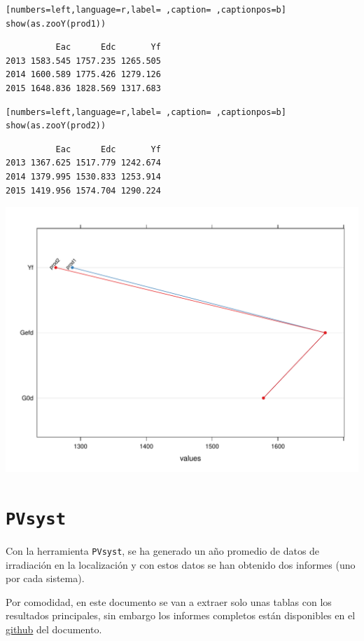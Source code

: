 \begin{lstlisting}[numbers=left,language=r,label= ,caption= ,captionpos=b]
show(as.zooY(prod1))
\end{lstlisting}

\begin{verbatim}
          Eac      Edc       Yf
2013 1583.545 1757.235 1265.505
2014 1600.589 1775.426 1279.126
2015 1648.836 1828.569 1317.683
\end{verbatim}


\begin{lstlisting}[numbers=left,language=r,label= ,caption= ,captionpos=b]
show(as.zooY(prod2))
\end{lstlisting}

\begin{verbatim}
          Eac      Edc       Yf
2013 1367.625 1517.779 1242.674
2014 1379.995 1530.833 1253.914
2015 1419.956 1574.704 1290.224
\end{verbatim}


\begin{center}
\includegraphics[width=.9\linewidth]{figuras/ejemplos2.pdf}
\end{center}
\section{\texttt{PVsyst}}
\label{sec:orgffea938}
Con la herramienta \texttt{PVsyst}, se ha generado un año promedio de datos de irradiación en la localización y con estos datos se han obtenido dos informes (uno por cada sistema).

Por comodidad, en este documento se van a extraer solo unas tablas con los resultados principales, sin embargo los informes completos están disponibles en el \href{https://github.com/solarization/TFG\_Francisco\_Delgado\_Lopez}{github} del documento.

